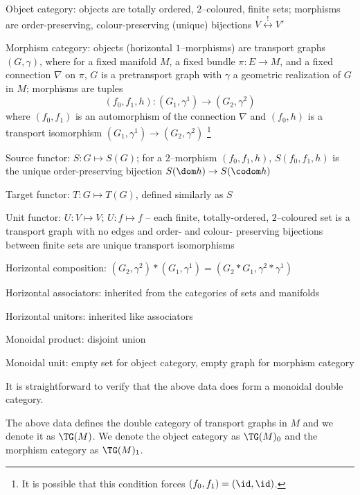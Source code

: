 \documentclass[./Thick_TQFTs_and_Quantum_Information.tex]{subfiles}
\begin{document}
\begin{enmrt}
\li Object category: objects are totally ordered, $2$--coloured, finite sets;
morphisms are order-preserving, colour-preserving (unique) bijections
$V \stackrel{!}{\longleftrightarrow} V'$

\li Morphism category: objects (horizontal $1$--morphisms) are transport graphs
$(G, \gamma)$, where for a fixed manifold $M$, a fixed bundle $\pi : E \to M$,
and a fixed connection $\nabla$ on $\pi$, $G$ is a pretransport graph with
$\gamma$ a geometric realization of $G$ in $M$; morphisms are tuples
\[
  (f_0, f_1, h) : (G_1, \gamma^1) \to (G_2, \gamma^2)
\]
where $(f_0, f_1)$ is an automorphism of the connection $\nabla$ and
$(f_0, h)$ is a transport isomorphism $(G_1, \gamma^1) \to (G_2, \gamma^2)$
\footnote{It is possible that this condition forces $(f_0, f_1) = (\id, \id)$.}

\li Source functor: $S : G \mapsto S(G)$; for a $2$--morphism $(f_0, f_1, h)$,
$S(f_0, f_1, h)$ is the unique order-preserving bijection
$S(\dom h) \to S(\codom h)$

\li Target functor: $T : G \mapsto T(G)$, defined similarly as $S$

\li Unit functor: $U : V \mapsto V$; $U : f \mapsto f$ -- each finite,
totally-ordered, $2$--coloured set is a transport graph with no edges and
order- and colour- preserving bijections between finite sets are unique
transport isomorphisms

\li Horizontal composition:
$(G_2, \gamma^2) * (G_1, \gamma^1) = (G_2 * G_1, \gamma^2 * \gamma^1)$

\li Horizontal associators: inherited from the categories of sets and manifolds

\li Horizontal unitors: inherited like associators

\li Monoidal product: disjoint union

\li Monoidal unit: empty set for object category, empty graph for morphism
category
\end{enmrt}

It is straightforward to verify that the above data does form a monoidal double
category.

\begin{defn}
The above data defines the double category of transport graphs in $M$ and we
denote it as $\TG(M)$. We denote the object category as $\TG(M)_0$ and the
morphism category as $\TG(M)_1$.
\end{defn}
\end{document}
